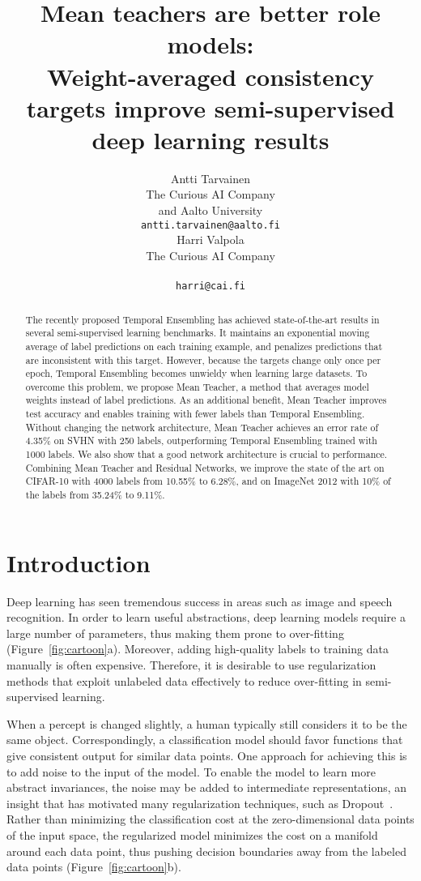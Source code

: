 \documentclass{article}
\title{Mean teachers are better role models:\\
Weight-averaged consistency targets improve semi-supervised deep learning results}
\author{
  Antti Tarvainen\\
  The Curious AI Company\\
  and Aalto University\\
  \texttt{antti.tarvainen@aalto.fi}\\
  \And
  Harri Valpola\\
  The Curious AI Company\\
  \\
  \texttt{harri@cai.fi}\\
}
\begin{document}
\maketitle

\begin{abstract}
The recently proposed Temporal Ensembling has achieved state-of-the-art results in several semi-supervised learning benchmarks.
It maintains an exponential moving average of label predictions on each training example, and penalizes predictions that are inconsistent with this target.
However, because the targets change only once per epoch, Temporal Ensembling becomes unwieldy when learning large datasets.
To overcome this problem, we propose Mean Teacher, a method that averages model weights instead of label predictions.
As an additional benefit, Mean Teacher improves test accuracy and enables training with fewer labels than Temporal Ensembling.
Without changing the network architecture, Mean Teacher achieves an error rate of 4.35\% on SVHN with 250 labels, outperforming Temporal Ensembling trained with 1000 labels.
We also show that a good network architecture is crucial to performance.
Combining Mean Teacher and Residual Networks, we improve the state of the art on CIFAR-10 with 4000 labels from 10.55\% to 6.28\%, and on ImageNet 2012 with 10\% of the labels from 35.24\% to 9.11\%.
\end{abstract}

\section{Introduction}

Deep learning has seen tremendous success in areas such as image and speech recognition.
In order to learn useful abstractions, deep learning models require a large number of parameters, thus making them prone to over-fitting (Figure~\ref{fig:cartoon}a).
Moreover, adding high-quality labels to training data manually is often expensive.
Therefore, it is desirable to use regularization methods that exploit unlabeled data effectively to reduce over-fitting in semi-supervised learning.

When a percept is changed slightly, a human typically still considers it to be the same object.
Correspondingly, a classification model should favor functions that give consistent output for similar data points.
One approach for achieving this is to add noise to the input of the model.
To enable the model to learn more abstract invariances, the noise may be added to intermediate representations, an insight that has motivated many regularization techniques, such as Dropout~\citep{srivastava_dropout:_2014}.
Rather than minimizing the classification cost at the zero-dimensional data points of the input space, the regularized model minimizes the cost on a manifold around each data point, thus pushing decision boundaries away from the labeled data points (Figure~\ref{fig:cartoon}b).
\end{document}
